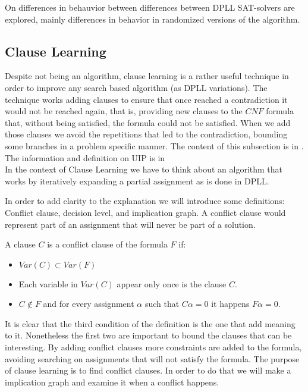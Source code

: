 On \cite{gomes2009exploiting} differences in behauvior between differences between DPLL SAT-solvers are explored, mainly differences in behavior in randomized versions of the algorithm.


\subsection{Clause Learning}
\label{sub:clauselearning}
Despite not being an algorithm, clause learning is a rather useful technique in order to improve any search based algorithm (as DPLL variations).  The technique works adding clauses to ensure that once reached a contradiction it would not be reached again, that is, providing new clauses to the $CNF$ formula that, without being satisfied, the formula could not be satisfied. When we add those clauses we avoid the repetitions that led to the contradiction, bounding some branches in a problem specific manner.  The content of this subsection is in \cite{tichy2006clause}. The information and definition on UIP is in \cite{zhang2001efficient} \\

In the context of Clause Learning we have to think about an algorithm that works by iteratively expanding a partial assignment as is done in DPLL.


In order to add clarity to the explanation we will introduce some definitions: Conflict clause, decision level, and implication graph. A conflict clause would represent part of an assignment that will never be part of a solution.  

\begin{definition}
  A clause $C$ is a conflict clause of the formula $F$ if:
  \begin{itemize}
  \item $Var(C) \subset Var(F)$
  \item Each variable in $Var(C)$ appear only once is the clause $C$.  
  \item $C \not\in F$ and for every assignment $\alpha$ such that $C\alpha = 0$ it happens $F\alpha = 0$.
  \end{itemize}
\end{definition}

It is clear that the third condition of the definition is the one that add meaning to it. Nonetheless the first two are important to bound the clauses that can be interesting. By adding conflict clauses more constraints are added to the formula, avoiding searching on assignments that will not satisfy the formula. The purpose of clause learning is to find conflict clauses. In order to do that we will make a implication graph and examine it when a conflict happens.\\

